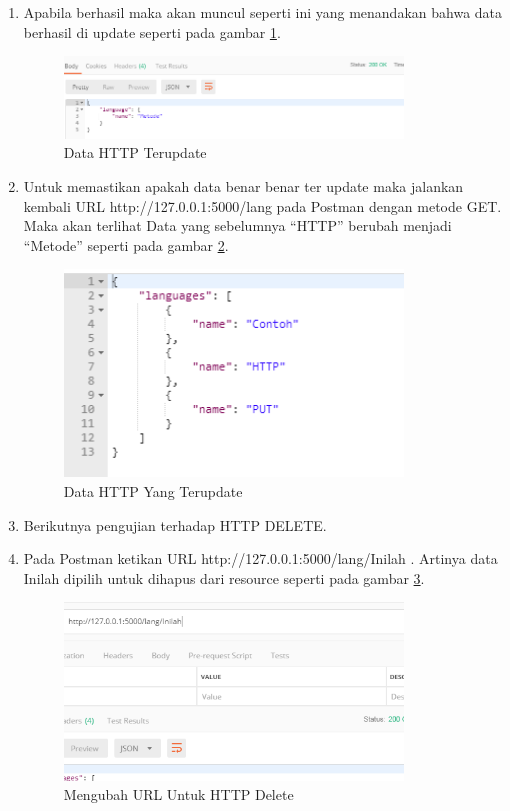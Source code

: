 \begin{enumerate}
\item Apabila berhasil maka akan muncul seperti ini yang menandakan bahwa data berhasil di update seperti pada gambar \ref{fig:dht}.
\begin{figure}[!htbp]
	\centerline{\includegraphics[width=0.85\textwidth]{figures/11/dht.PNG}}
	\caption{Data HTTP Terupdate}
	\label{fig:dht}
\end{figure}
 
\item Untuk memastikan apakah data benar benar ter update maka jalankan kembali URL http://127.0.0.1:5000/lang pada Postman dengan metode GET. Maka akan terlihat Data yang sebelumnya “HTTP” berubah menjadi “Metode” seperti pada gambar \ref{fig:dhu}.
\begin{figure}[!htbp]
	\centerline{\includegraphics[width=0.85\textwidth]{figures/11/dhu.PNG}}
	\caption{Data HTTP Yang Terupdate}
	\label{fig:dhu}
\end{figure}
 
\item Berikutnya pengujian terhadap HTTP DELETE.
\item Pada Postman ketikan URL http://127.0.0.1:5000/lang/Inilah . Artinya data Inilah dipilih untuk dihapus dari resource seperti pada gambar \ref{fig:uhd}.
\begin{figure}[!htbp]
	\centerline{\includegraphics[width=0.85\textwidth]{figures/11/uhd.PNG}}
	\caption{Mengubah URL Untuk HTTP Delete}
	\label{fig:uhd}
\end{figure}


\end{enumerate}
